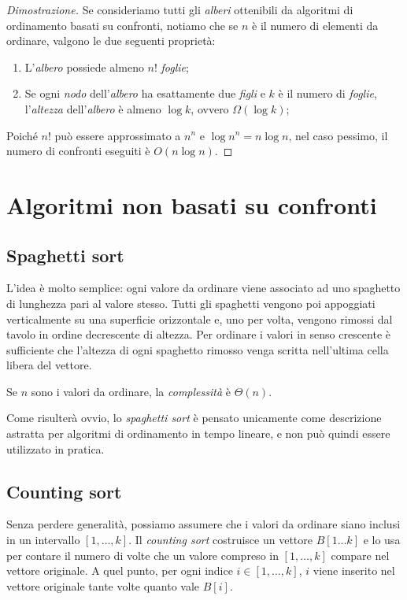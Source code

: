 \begin{proof}[Dimostrazione]
    Se consideriamo tutti gli \emph{alberi} ottenibili da algoritmi di
    ordinamento basati su confronti, notiamo che se $n$ è il numero di elementi
    da ordinare, valgono le due seguenti proprietà:
    \begin{enumerate}
        \item L'\emph{albero} possiede almeno $n!$ \emph{foglie};
        \item Se ogni \emph{nodo} dell'\emph{albero} ha esattamente due \emph{figli}
        e $k$ è il numero di \emph{foglie}, l'\emph{altezza} dell'\emph{albero} è
        almeno $\log k$, ovvero $\Omega(\log k)$;
    \end{enumerate}
    Poiché $n!$ può essere approssimato a $n^n$ e $\log n^n=n\log n$, nel caso
    pessimo, il numero di confronti eseguiti è $O(n\log n)$.
\end{proof}

\section{Algoritmi non basati su confronti}
\subsection{Spaghetti sort}
L'idea è molto semplice: ogni valore da ordinare viene associato ad uno spaghetto
di lunghezza pari al valore stesso. Tutti gli spaghetti vengono poi appoggiati
verticalmente su una superficie orizzontale e, uno per volta, vengono rimossi
dal tavolo in ordine decrescente di altezza. Per ordinare i valori in senso
crescente è sufficiente che l'altezza di ogni spaghetto rimosso venga scritta
nell'ultima cella libera del vettore.

\bigskip\noindent
Se $n$ sono i valori da ordinare, la \emph{complessità} è $\Theta(n)$.

\begin{note}
    Come risulterà ovvio, lo \emph{spaghetti sort} è pensato unicamente come
    descrizione astratta per algoritmi di ordinamento in tempo lineare, e non
    può quindi essere utilizzato in pratica.
\end{note}

\subsection{Counting sort}
Senza perdere generalità, possiamo assumere che i valori da ordinare siano
inclusi in un intervallo $[1,\dots,k]$. Il \emph{counting sort} costruisce un
vettore $B[1\dots k]$ e lo usa per contare il numero di volte che un valore
compreso in $[1,\dots,k]$ compare nel vettore originale. A quel punto, per ogni
indice $i\in[1,\dots,k]$, $i$ viene inserito nel vettore originale tante volte
quanto vale $B[i]$.

